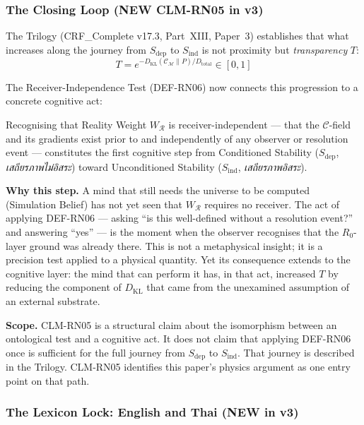 \documentclass[12pt, a4paper]{article}
\begin{document}
\subsubsection{The Closing Loop (NEW CLM-RN05 in v3)}

The Trilogy (CRF\_Complete v17.3, Part~XIII, Paper~3) establishes
that what increases along the journey from $S_{\mathrm{dep}}$ to
$S_{\mathrm{ind}}$ is not proximity but \emph{transparency} $T$:
\[
  T = e^{-D_{\mathrm{KL}}(\mathcal{C}_\mathcal{M}\|P)/D_{\mathrm{total}}}
  \in [0,1]
\]

The Receiver-Independence Test (DEF-RN06) now connects this
progression to a concrete cognitive act:

\begin{keybox}[title={CLM-RN05: Recognition of $W_{\mathcal{R}}$
as the First Cognitive Step (NEW v3)}]
Recognising that Reality Weight $W_{\mathcal{R}}$ is
receiver-independent --- that the $\mathcal{C}$-field and its
gradients exist prior to and independently of any observer or
resolution event --- constitutes the first cognitive step from
Conditioned Stability ($S_{\mathrm{dep}}$,
\emph{เสถียรภาพไม่อิสระ}) toward Unconditioned Stability
($S_{\mathrm{ind}}$, \emph{เสถียรภาพอิสระ}).

\medskip
\textbf{Why this step.} A mind that still needs the universe
to be computed (Simulation Belief) has not yet seen that
$W_{\mathcal{R}}$ requires no receiver. The act of applying
DEF-RN06 --- asking ``is this well-defined without a resolution
event?'' and answering ``yes'' --- is the moment when the observer
recognises that the $R_0$-layer ground was already there. This is
not a metaphysical insight; it is a precision test applied to a
physical quantity. Yet its consequence extends to the cognitive
layer: the mind that can perform it has, in that act, increased
$T$ by reducing the component of $D_{\mathrm{KL}}$ that came
from the unexamined assumption of an external substrate.

\medskip
\textbf{Scope.} CLM-RN05 is a structural claim about the
isomorphism between an ontological test and a cognitive act.
It does not claim that applying DEF-RN06 once is sufficient for
the full journey from $S_{\mathrm{dep}}$ to $S_{\mathrm{ind}}$.
That journey is described in the Trilogy. CLM-RN05 identifies
this paper's physics argument as one entry point on that path.
\end{keybox}

\subsubsection{The Lexicon Lock: English and Thai (NEW in v3)}
\end{document}
